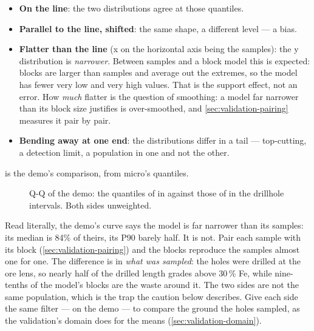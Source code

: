 \begin{itemize}
\item \textbf{On the line}: the two distributions agree at those quantiles.
\item \textbf{Parallel to the line, shifted}: the same shape, a different level — a bias.
\item \textbf{Flatter than the line} (x on the horizontal axis being the samples): the y distribution is \emph{narrower}. Between samples and a block model this is expected: blocks are larger than samples and average out the extremes, so the model has fewer very low and very high values. That is the support effect, not an error. How \emph{much} flatter is the question of smoothing: a model far narrower than its block size justifies is over-smoothed, and \cref{sec:validation-pairing} measures it pair by pair.
\item \textbf{Bending away at one end}: the distributions differ in a tail — top-cutting, a detection limit, a population in one and not the other.
\end{itemize}

 is the demo's comparison, from micro's quantiles.

\begin{figure}[htbp]\centering
{}
\caption{Q-Q of the demo: the quantiles of  in  against those of  in the drillhole intervals. Both sides unweighted.}\label{fig:qq-demo}
\end{figure}

Read literally, the demo's curve says the model is far narrower than its samples: its median is 84\% of theirs, its P90 barely half. It is not. Pair each sample with its block (\cref{sec:validation-pairing}) and the blocks reproduce the samples almost one for one. The difference is in \emph{what was sampled}: the holes were drilled at the ore lens, so nearly half of the drilled length grades above 30\,\% Fe, while nine-tenths of the model's blocks are the waste around it. The two sides are not the same population, which is the trap the caution below describes. Give each side the same filter —  on the demo — to compare the ground the holes sampled, as the validation's domain does for the means (\cref{sec:validation-domain}).

